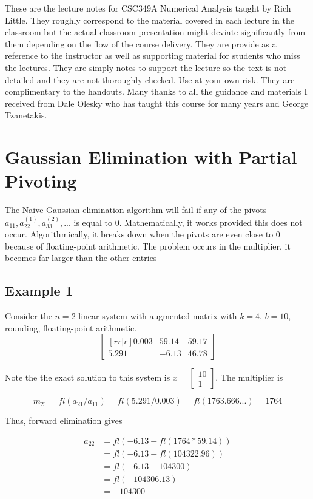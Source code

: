 \documentclass [titlepage,12pt,letter] {article}
\begin{document}
 


These are the lecture notes for CSC349A Numerical Analysis taught by
Rich Little. They roughly correspond to
the material covered in each lecture in the classroom but the actual
classroom presentation might deviate significantly from them depending
on the flow of the course delivery. They are provide as a reference to
the instructor as well as supporting material for students who miss
the lectures. They are simply notes to support the lecture so the text
is not detailed and they are not thoroughly checked. Use at your own
risk. They are complimentary to the handouts. Many thanks to all the
guidance and materials I received from Dale Olesky who has taught this
course for many years and George Tzanetakis. 


\section{Gaussian Elimination with Partial Pivoting}
The Naive Gaussian elimination algorithm will fail if any of the pivots $a_{11}, a_{22}^{(1)},a_{33}^{(2)}, ...$ is equal to $0$. Mathematically, it works provided this does not occur. Algorithmically, it breaks down when the pivots are even close to $0$ because of floating-point arithmetic. The problem occurs in the multiplier, it becomes far larger than the other entries
\subsection{Example 1} Consider the $n=2$ linear system with augmented matrix with $k=4$, $b=10$, rounding, floating-point arithmetic.
\[
\begin{bmatrix}[rr|r]
	0.003	&	59.14	&	59.17 \\
	5.291		&	-6.13	&	46.78
\end{bmatrix}
\]

Note the the exact solution to this system is $x=\begin{bmatrix}10 \\ 1 \end{bmatrix}$. The multiplier is

\[
m_{21}=fl(a_{21}/a_{11})=fl(5.291/0.003)=fl(1763.666...)=1764
\]

Thus, forward elimination gives

\begin{align*}
a_{22}&=fl(-6.13-fl(1764*59.14)) \\
&=fl(-6.13-fl(104322.96)) \\
&=fl(-6.13-104300) \\
&=fl(-104306.13) \\
&=-104300
\end{align*}
\end{document}
